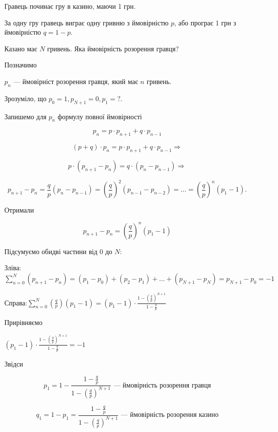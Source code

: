 \begin{example}
    Гравець починає гру в казино, маючи 1 грн.
    
    За одну гру гравець виграє одну гривню з ймовірністю $p$, 
    або програє 1 грн з ймовірністю $q = 1-p$.
    
    Казано має $N$ гривень. Яка ймовірність розорення гравця?
    
    Позначимо
    
    $p_n$ --- ймовірніст розорення гравця, який має $n$ гривень.
    
    Зрозуміло, що $p_0 = 1, p_{N+1} = 0, p_1 = ?$.
    
    Запишемо для $p_n$ формулу повної ймовірності
    
    $$p_n = p \cdot p_{n+1} + q \cdot p_{n-1}$$
    
    $$(p+q) \cdot p_n = p \cdot p_{n+1} + q \cdot p_{n-1} \Rightarrow$$
    
    $$p \cdot (p_{n+1} - p_n) = q \cdot (p_n - p_{n-1}) \Rightarrow$$
    
    $$p_{n+1} - p_n = \frac{q}{p} (p_n - p_{n-1})
    = \left(\frac{q}{p}\right)^2 (p_{n-1} - p_{n-2})
    = ...
    = \left(\frac{q}{p}\right)^n (p_{1} - 1).$$
    
    Отримали
    
    $$p_{n+1} - p_n = \left(\frac{q}{p}\right)^n (p_1 - 1)$$
    
    Підсумуємо обидві частини від 0 до $N$:
    
    Зліва: $\sum\limits_{n=0}^N (p_{n+1} - p_n)
    = (p_1 - p_0) + (p_2 - p_1) + ... + (p_{N+1} - p_{N})
    = p_{N+1} - p_0
    = -1$
    
    Справа:$\sum\limits_{n=0}^N \left(\frac{q}{p}\right) (p_{1} - 1)
    = (p_1 - 1) \cdot \frac{1 - \left(\frac{q}{p}\right)^{N+1}}{1 - \frac{q}{p}}$
    
    Прирівняємо
    
    $(p_1 - 1) \cdot \frac{1 - \left(\frac{q}{p}\right)^{N+1}}{1 - \frac{q}{p}} = -1$
    
    Звідси
    
    \begin{equation*}
        p_1
        = 1 - \frac{1 - \frac{q}{p}}{1 - \left(\frac{q}{p}\right)^{N+1}}
        \text{ --- ймовірність розорення гравця}
    \end{equation*}
    
    \begin{equation*}
        q_1
        = 1 - p_1
        = \frac{1 - \frac{q}{p}}{1 - \left(\frac{q}{p}\right)^{N+1}}
        \text{ --- ймовірність розорення казино}
    \end{equation*}
    

\end{example}
